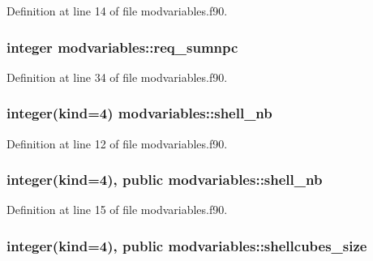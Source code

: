 Definition at line 14 of file modvariables.\-f90.

\hypertarget{classmodvariables_a64644f9282a9c19faf8ccb44b0e60877}{
\subsubsection[{req\-\_\-sumnpc}]{\setlength{\rightskip}{0pt plus 5cm}integer modvariables\-::req\-\_\-sumnpc}}\label{classmodvariables_a64644f9282a9c19faf8ccb44b0e60877}


Definition at line 34 of file modvariables.\-f90.

\hypertarget{classmodvariables_a8e749d6e70dade5cb6d75a09a99cefd7}{
\subsubsection[{shell\-\_\-nb}]{\setlength{\rightskip}{0pt plus 5cm}integer(kind=4) modvariables\-::shell\-\_\-nb}}\label{classmodvariables_a8e749d6e70dade5cb6d75a09a99cefd7}


Definition at line 12 of file modvariables.\-f90.

\hypertarget{classmodvariables_a56011f110cb607bad4e96bbf7426d6d6}{
\subsubsection[{shell\-\_\-nb}]{\setlength{\rightskip}{0pt plus 5cm}integer(kind=4), public modvariables\-::shell\-\_\-nb}}\label{classmodvariables_a56011f110cb607bad4e96bbf7426d6d6}


Definition at line 15 of file modvariables.\-f90.

\hypertarget{classmodvariables_a79023913d4487b1b36fb2aa2dca94506}{
\subsubsection[{shellcubes\-\_\-size}]{\setlength{\rightskip}{0pt plus 5cm}integer(kind=4), public modvariables\-::shellcubes\-\_\-size}}\label{classmodvariables_a79023913d4487b1b36fb2aa2dca94506}


